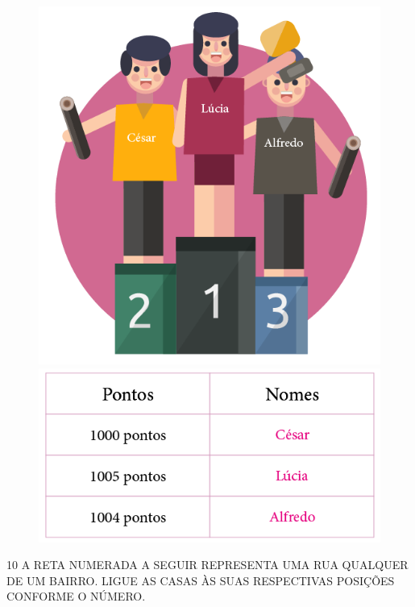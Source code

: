 \begin{figure}[H]
\centering
\includegraphics[width=.8\textwidth]{./media/SAEB_1ANO_MAT_FIGURA13.png}
\includegraphics[width=.8\textwidth]{./media/SAEB_1ANO_MAT_FIGURA13a.png}
\end{figure}



 
\num{10} A RETA NUMERADA A SEGUIR REPRESENTA UMA RUA QUALQUER DE UM BAIRRO. LIGUE AS CASAS ÀS SUAS RESPECTIVAS POSIÇÕES CONFORME O NÚMERO.

